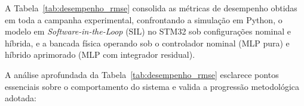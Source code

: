 A Tabela~\ref{tab:desempenho_rmse} consolida as métricas de desempenho obtidas em toda a campanha experimental, confrontando a simulação em Python, o modelo em \textit{Software-in-the-Loop} (SIL) no STM32 sob configurações nominal e híbrida, e a bancada física operando sob o controlador nominal (MLP pura) e híbrido aprimorado (MLP com integrador residual).

\begin{table}[H]
    \centering
    \caption{Desempenho comparativo entre os ambientes da tríade e evolução para o controlador híbrido na bancada física.}
    \label{tab:desempenho_rmse}
\end{table}

A análise aprofundada da Tabela~\ref{tab:desempenho_rmse} esclarece pontos essenciais sobre o comportamento do sistema e valida a progressão metodológica adotada:

